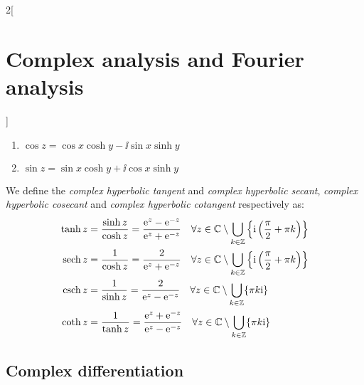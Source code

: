 \documentclass[../../../main.tex]{subfiles}
\begin{document}
\begin{multicols}{2}[\section{Complex analysis and Fourier analysis}]
\begin{proposition}
    \begin{enumerate}
      \item $\cos z = \cos x \cosh y - \ii \sin x \sinh y$
      \item $\sin z = \sin x \cosh y + \ii \cos x \sinh y$
    \end{enumerate}
  \end{proposition}
  \begin{definition}
    We define the \emph{complex hyperbolic tangent} and \emph{complex hyperbolic secant}, \emph{complex hyperbolic cosecant} and \emph{complex hyperbolic cotangent} respectively as:
    \begin{align*}
      \tanh z & = \frac{\sinh z}{\cosh z}=\frac{\exp{z}-\exp{-z}}{\exp{z}+\exp{-z}}\quad \forall z\in\CC\setminus\bigcup_{k\in\ZZ}\left\{\ii\left(\frac{\pi}{2}+\pi k\right)\right\} \\
      \sech z & = \frac{1}{\cosh z}=\frac{2}{\exp{z}+\exp{-z}}\quad \forall z\in\CC\setminus\bigcup_{k\in\ZZ}\left\{\ii\left(\frac{\pi}{2}+\pi k\right)\right\}                      \\
      \csch z & = \frac{1}{\sinh z}=\frac{2}{\exp{z}-\exp{-z}}\quad\forall z\in\CC\setminus\bigcup_{k\in\ZZ}\{\pi k\ii\}                                                             \\
      \coth z & = \frac{1}{\tanh z}=\frac{\exp{z}+\exp{-z}}{\exp{z}-\exp{-z}}\quad\forall z\in\CC\setminus\bigcup_{k\in\ZZ}\{\pi k\ii\}
    \end{align*}
  \end{definition}
  \subsection{Complex differentiation}

\end{multicols}
\end{document}
